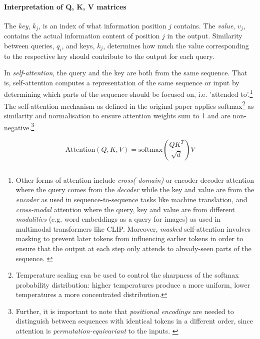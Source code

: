 \vspace{-5pt}

\paragraph{Interpretation of Q, K, V matrices}

The \textit{key}, $k_j$, is an index of what information position $j$ contains.
The \textit{value}, $v_j$, contains the actual information content of position $j$ in the output.
Similarity between queries, $q_i$, and keys, $k_j$, determines how much the value
corresponding to the respective key should contribute to the output for each query.

In \textit{self-attention}, the query and the key are both from the same sequence.
That is, self-attention computes a representation of the same sequence or input by determining which parts of the sequence should be focused on, i.e. 'attended to'.\footnote{
    Other forms of attention include
    \textit{cross(-domain)} or encoder-decoder attention where the query comes from the \textit{decoder} while the key and value are from the \textit{encoder} as used in sequence-to-sequence tasks like machine translation, and
    \textit{cross-modal} attention where the query, key and value are from different \textit{modalities} (e.g. word embeddings as a query for images) as used in multimodal transformers like CLIP.
    Moreover, \textit{masked} self-attention involves masking to prevent later tokens from influencing earlier tokens in order to ensure that the output at each step only attends to already-seen parts of the sequence.
    \citep{prince2023understanding,ye2022geometry}
}
The self-attention mechanism as defined in the original paper \citep{vaswani2023attentionneed}
applies softmax\footnote{
    Temperature scaling can be used to control the sharpness of the softmax probability distribution:
    higher temperatures produce a more uniform, lower temperatures a more concentrated distribution.
} as similarity and normalisation
to ensure attention weights sum to 1 and are non-negative.\footnote{
    Further, it is important to note that \textit{positional encodings} are needed to distinguish between sequences with identical tokens in a different order,
    since attention is \textit{permutation-equivariant} to the inputs. \citep{prince2023understanding}
}

\vspace{-5pt}
\begin{equation}
    \text{Attention}(Q, K, V) = \text{softmax}\left(\frac{QK^T}{\sqrt{d}}\right) V
\end{equation}
\vspace{-15pt}

